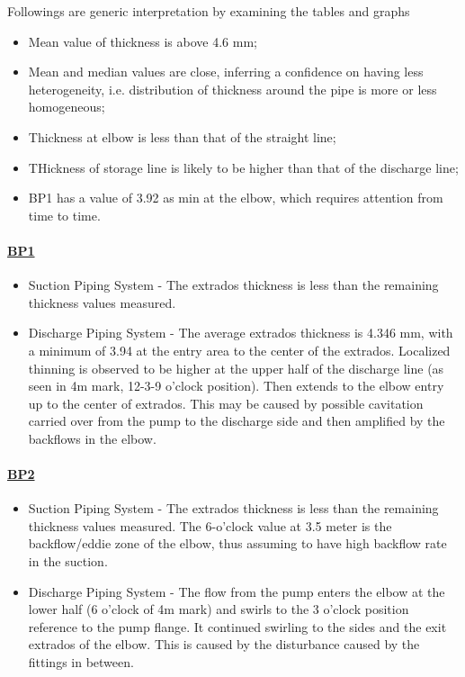 Followings are generic interpretation by examining the tables and graphs
\begin{itemize}
\item Mean value of thickness is above 4.6 mm;
\item Mean and median values are close, inferring a confidence on having less heterogeneity, i.e. distribution of thickness around the pipe is more or less homogeneous;
\item Thickness at elbow is less than that of the straight line;
\item THickness of storage line is likely to be higher than that of the discharge line;
\item BP1 has a value of 3.92 as min at the elbow, which requires attention from time to time.
\end{itemize}

\paragraph{\underline{BP1}}
\begin{itemize}
	\item Suction Piping System - The extrados thickness is less than the remaining thickness values measured.
	\item 	Discharge Piping System - The average extrados thickness is 4.346 mm, with a minimum of 3.94 at the entry area to the center of the extrados. Localized thinning is observed to be higher at the upper half of the discharge line (as seen in 4m mark, 12-3-9 o'clock position). Then extends to the elbow entry up to the center of extrados. This may be caused by possible cavitation carried over from the pump to the discharge side and then amplified by the backflows in the elbow.
\end{itemize}

\paragraph{\underline{BP2}}
\begin{itemize}
	\item Suction Piping System - The extrados thickness is less than the remaining thickness values measured. The 6-o'clock value at 3.5 meter is the backflow/eddie zone of the elbow, thus assuming to have high backflow rate in the suction.
	\item	Discharge Piping System - The flow from the pump enters the elbow at the lower half (6 o'clock of 4m mark) and swirls to the 3 o'clock position reference to the pump flange. It continued swirling to the sides and the exit extrados of the elbow. This is caused by the disturbance caused by the fittings in between.
\end{itemize}


